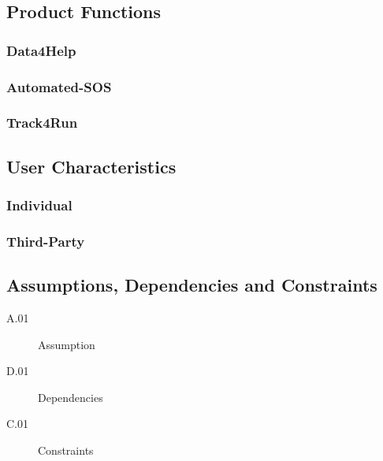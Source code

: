 \documentclass[a4paper]{article}
\begin{document}
    \subsection{Product Functions}
    
        \subsubsection{Data4Help}
        
        \subsubsection{Automated-SOS}
        
        \subsubsection{Track4Run}
    
    \subsection{User Characteristics}
    
        \subsubsection{Individual}
        
        \subsubsection{Third-Party}
        
    \subsection{Assumptions, Dependencies and Constraints}
        \begin{description}
            \item[A.01] Assumption
        \end{description}
        
        \begin{description}
            \item[D.01] Dependencies
        \end{description}
        
        \begin{description}
            \item[C.01] Constraints
        \end{description}
\newpage
\end{document}
